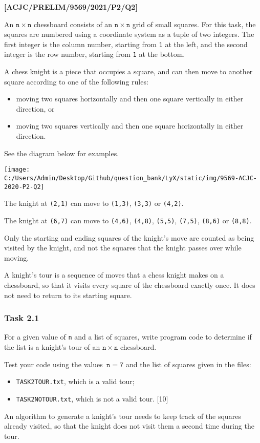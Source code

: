 \item \textbf{{[}ACJC/PRELIM/9569/2021/P2/Q2{]} }

An $\mathtt{n\times n}$ chessboard consists of an $\mathtt{n\times n}$
grid of small squares. For this task, the squares are numbered using
a coordinate system as a tuple of two integers. The first integer
is the column number, starting from \texttt{1} at the left, and the
second integer is the row number, starting from \texttt{1} at the
bottom.

A chess knight is a piece that occupies a square, and can then move
to another square according to one of the following rules:
\begin{itemize}
\item moving two squares horizontally and then one square vertically in
either direction, or 
\item moving two squares vertically and then one square horizontally in
either direction.
\end{itemize}
See the diagram below for examples.
\begin{center}
\texttt{[image: C:/Users/Admin/Desktop/Github/question\_bank/LyX/static/img/9569-ACJC-2020-P2-Q2]}
\par\end{center}

The knight at \texttt{(2,1)} can move to \texttt{(1,3)}, \texttt{(3,3)}
or \texttt{(4,2)}. 

The knight at \texttt{(6,7)} can move to \texttt{(4,6)}, \texttt{(4,8)},
\texttt{(5,5)}, \texttt{(7,5)}, \texttt{(8,6)} or \texttt{(8,8)}.

Only the starting and ending squares of the knight\textquoteright s
move are counted as being visited by the knight, and not the squares
that the knight passes over while moving.

A knight\textquoteright s tour is a sequence of moves that a chess
knight makes on a chessboard, so that it visits every square of the
chessboard exactly once. It does not need to return to its starting
square.

\subsubsection*{Task 2.1}

For a given value of \texttt{n} and a list of squares, write program
code to determine if the list is a knight\textquoteright s tour of
an $\mathtt{n\times n}$ chessboard.

Test your code using the values\texttt{ $\mathtt{n=7}$} and the list
of squares given in the files: 
\begin{itemize}
\item \texttt{TASK2TOUR.txt}, which is a valid tour; 
\item \texttt{TASK2NOTOUR.txt}, which is not a valid tour. \hfill{}{[}10{]}
\end{itemize}
An algorithm to generate a knight\textquoteright s tour needs to keep
track of the squares already visited, so that the knight does not
visit them a second time during the tour.

